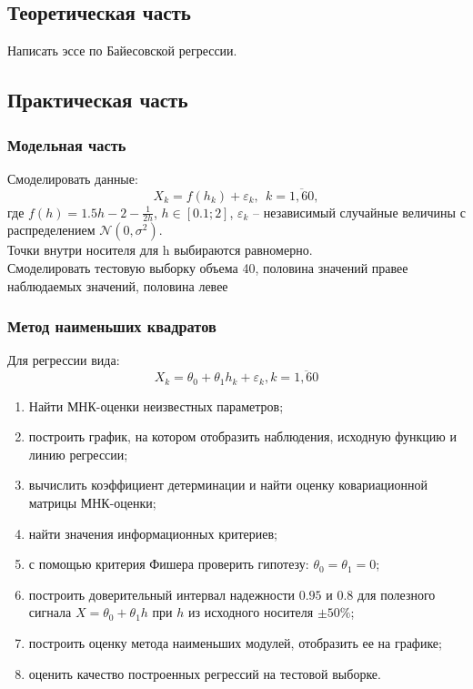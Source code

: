 \documentclass[a4paper,12pt]{article}
\begin{document}
\subsection{Теоретическая часть}
Написать эссе по Байесовской регрессии.



\subsection{Практическая часть}

\subsubsection{Модельная часть}

Смоделировать данные:
$$ X_k = f(h_k) + \varepsilon_k ,~~k=\overline{1,60}, $$
где $f(h) = 1.5h - 2 - \frac{1}{2h}$, $h\in [0.1;2]$, $\varepsilon_k$ -- независимый случайные величины с распределением $\mathcal{N}(0,\sigma^2)$.\\
Точки внутри носителя для h выбираются равномерно.\\
Смоделировать тестовую выборку объема 40, половина значений правее наблюдаемых значений, половина левее\\


\subsubsection{Метод наименьших квадратов}

Для регрессии вида:
$$ X_k = \theta_0 + \theta_1 h_k + \varepsilon_k, k=\overline{1,60} $$

\begin{enumerate}
    \item Найти МНК-оценки неизвестных параметров;
    \item построить график, на котором отобразить наблюдения, исходную функцию и линию регрессии;
    \item вычислить коэффициент детерминации и найти оценку ковариационной матрицы МНК-оценки;
    \item найти значения информационных критериев;
    \item с помощью критерия Фишера проверить гипотезу: $\theta_0=\theta_1=0$;
    \item построить доверительный интервал надежности $0.95$ и $0.8$ для полезного сигнала $X = \theta_0 + \theta_1 h$ при $h$ из исходного носителя $\pm 50\%$;
    \item построить оценку метода наименьших модулей, отобразить ее на графике;
    \item оценить качество построенных регрессий на тестовой выборке.
\end{enumerate}
\end{document}
